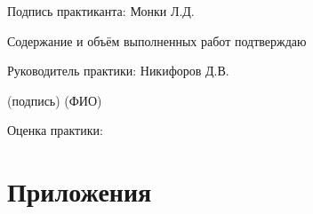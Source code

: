 \documentclass[a4paper,12pt]{article}
\begin{document}
	\vspace{10ex}
	    
    Подпись практиканта: \hspace{3ex} \underline{\hspace{12ex}} \hspace{3ex} Монки Л.Д.
	
	\hspace{30ex}{\scriptsize(подпись)} \hspace{10ex}{\scriptsize(ФИО)}
	
	\vspace{4ex}

	Содержание и объём выполненных работ подтверждаю

	\vspace{2ex}
	
	Руководитель практики:\hspace{3ex} \underline{\hspace{12ex}} \hspace{3ex} Никифоров Д.В.
	
	\hspace{32ex}\scriptsize{(подпись)} \hspace{14ex} {\scriptsize(ФИО)}
	
	\vspace{4ex}
	
	{\normalsize Оценка практики:\hspace{3ex}} \underline{\hspace{12ex}}
    



	\newpage

	\section*{Приложения}
	
	
	
	
		
\end{document}
